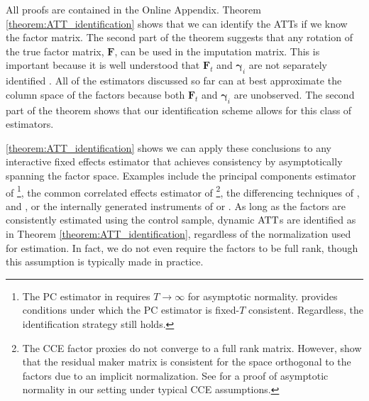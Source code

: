 \documentclass[12pt]{article}
\begin{document}
All proofs are contained in the Online Appendix. Theorem \ref{theorem:ATT_identification} shows that we can identify the ATTs if we know the factor matrix. The second part of the theorem suggests that any rotation of the true factor matrix, $\bm{F}$, can be used in the imputation matrix. This is important because it is well understood that $\bm{F}_t$ and $\bm{\gamma}_i$ are not separately identified \citep{Ahn_Lee_Schmidt_2013,Xu_2017}. All of the estimators discussed so far can at best approximate the column space of the factors because both $\bm{F}_t$ and $\bm \gamma_i$ are unobserved. The second part of the theorem shows that our identification scheme allows for this class of estimators. 

\autoref{theorem:ATT_identification} shows we can apply these conclusions to any interactive fixed effects estimator that achieves consistency by asymptotically spanning the factor space. Examples include the principal components estimator of \citet{Bai_2009}\footnote{The PC estimator in \citet{Bai_2009} requires $T \rightarrow \infty$ for asymptotic normality. \citet{Westerlund_2020} provides conditions under which the PC estimator is fixed-$T$ consistent. Regardless, the identification strategy still holds.}, the common correlated effects estimator of \citet{pesaran2006estimation}\footnote{The CCE factor proxies do not converge to a full rank matrix. However, \citet{Westerlund_Petrova_Norkute_2019} show that the residual maker matrix is consistent for the space orthogonal to the factors due to an implicit normalization. See \citet{Brown_Butts_Westerlund_2023} for a proof of asymptotic normality in our setting under typical CCE assumptions.}, the differencing techniques of \citet{Ahn_Lee_Schmidt_2001,Ahn_Lee_Schmidt_2013}, \citet{Callaway_Karami_2020} and \citet{Brown_2022}, or the internally generated instruments of \citet{Juodis_Sarafidis_2022} or \citet{Cui_et_al_2022}. As long as the factors are consistently estimated using the control sample, dynamic $\text{ATT}$s are identified as in Theorem \ref{theorem:ATT_identification}, regardless of the normalization used for estimation. In fact, we do not even require the factors to be full rank, though this assumption is typically made in practice. 
\end{document}
